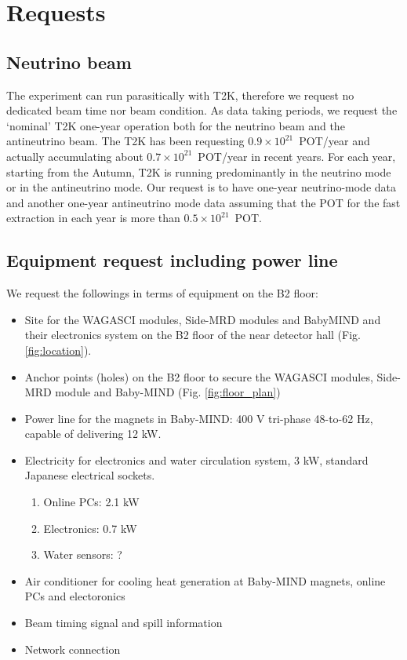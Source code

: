 \section{Requests}

\subsection{Neutrino beam}
The experiment can run parasitically with T2K, therefore we request no dedicated beam time nor beam condition.
As data taking periods, we request the `nominal' T2K one-year operation both for the neutrino beam and the antineutrino beam.
The T2K has been requesting $0.9\times10^{21}$~POT/year and actually accumulating about $0.7\times10^{21}$~POT/year in recent years.
For each year, starting from the Autumn,  T2K is running predominantly in the neutrino mode or in the antineutrino mode.
Our request is to have one-year neutrino-mode data and another one-year antineutrino mode data
assuming that the POT for the fast extraction in each year is more than $0.5\times10^{21}$~POT.

\subsection{Equipment request including power line}
We request the followings in terms of equipment on the B2 floor:
\begin{itemize}
\item Site for the WAGASCI modules, Side-MRD modules and BabyMIND and their electronics system on the B2 floor of the near detector hall (Fig. \ref{fig:location}).
\item Anchor points (holes) on the B2 floor to secure the WAGASCI modules, Side-MRD module and Baby-MIND (Fig. \ref{fig:floor_plan})
\item Power line for the magnets in Baby-MIND: 400 V tri-phase 48-to-62 Hz, capable of delivering 12 kW.
\item Electricity for electronics and water circulation system, 3 kW, standard Japanese electrical sockets.
	\begin{enumerate}
		\item Online PCs: 2.1 kW
		\item Electronics: 0.7 kW
		\item Water sensors: ?
	\end{enumerate}
\item Air conditioner for cooling heat generation at Baby-MIND magnets, online PCs and electoronics
\item Beam timing signal and spill information
\item Network connection
\end{itemize}


